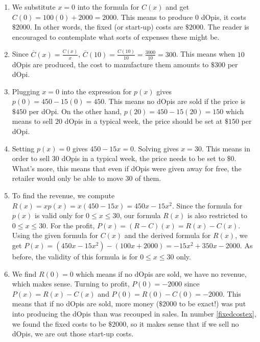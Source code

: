 {
\begin{enumerate}

\item \label{fixedcostex} We substitute $x=0$ into the formula for $C(x)$ and get $C(0) = 100(0) + 2000 = 2000$.  This means to produce $0$ dOpis, it costs $\$2000$.  In other words, the fixed (or start-up) costs are $\$2000$. The reader is encouraged to contemplate what sorts of expenses these might be.

\item  Since $\overline{C}(x) = \frac{C(x)}{x}$, $\overline{C}(10) = \frac{C(10)}{10} = \frac{3000}{10} = 300$.  This means when $10$ dOpis are produced, the cost to manufacture them amounts to $\$ 300$ per dOpi.

\drawexampleline

\item Plugging $x=0$ into the expression for $p(x)$ gives $p(0) = 450 - 15(0) = 450$.  This means no dOpis are sold if the price is  $\$450$ per dOpi.  On the other hand, $p(20) = 450-15(20) = 150$ which means to sell $20$ dOpis in a typical week, the price should be set at $\$150$ per dOpi.

\item  Setting $p(x) = 0$ gives $450-15x = 0$.  Solving gives $x = 30$.  This means in order to sell $30$ dOpis in a typical week, the price needs to be set to $\$ 0$. What's more, this means that even if dOpis were given away for free, the retailer would only be able to move $30$ of them.

\item  To find the revenue, we compute $R(x) = x p(x) = x (450 - 15x) = 450x - 15x^2$.  Since the formula for $p(x)$ is valid only for $0 \leq x \leq 30$, our formula $R(x)$ is also restricted to $0 \leq x \leq 30$.  For the profit, $P(x) = (R-C)(x) = R(x) - C(x)$.  Using the given formula for $C(x)$ and the derived formula for $R(x)$, we get $P(x) = \left(450x - 15x^2\right) -(100x+2000) = -15x^2+350x-2000$. As before, the validity of this formula is for $0 \leq x \leq 30$ only.

\item  We find $R(0) = 0$ which means if no dOpis are sold, we have no revenue, which makes sense.  Turning to profit, $P(0) = -2000$ since $P(x) = R(x) - C(x)$ and $P(0) = R(0) - C(0) = -2000$.  This means that if no dOpis are sold, more money ($\$2000$ to be exact!) was put into producing the dOpis than was recouped in sales. In number \ref{fixedcostex}, we found the fixed costs to be $\$2000$, so it makes sense that if we sell no dOpis, we are out those start-up costs. 


\end{enumerate}}
